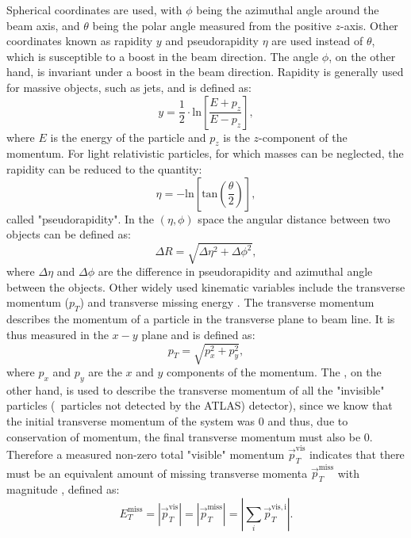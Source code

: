 	Spherical coordinates are used, with $\phi$ being the azimuthal angle around the beam axis, and $\theta$ being the polar angle measured from the positive $z$-axis. 
	Other coordinates known as rapidity $y$ and pseudorapidity $\eta$ are used instead of $\theta$, which is susceptible to a boost in the beam direction. The angle $\phi$, on the other hand, is invariant under a boost in the beam direction. 
	Rapidity is generally used for massive objects, such as jets, and is defined as:
	\begin{equation}
	y=\frac{1}{2}\cdot\mathrm{ln}\left[\frac{E+p_z}{E-p_z}\right],
	\end{equation}
	where $E$ is the energy of the particle and $p_z$ is the $z$-component of the momentum.
	For light relativistic particles, for which masses can be neglected, the 
	rapidity can be reduced to the quantity:
	\begin{equation}
	\eta=-\mathrm{ln}\left[\mathrm{tan}\left(\frac{\theta}{2}\right)\right],
	\end{equation}
	called "pseudorapidity".
	In the $(\eta,\phi)$ space the angular distance between two objects can be defined as:
	\begin{equation}
	\Delta R = \sqrt{\Delta\eta^2+\Delta\phi^2},
	\end{equation}
	where $\Delta\eta$ and $\Delta\phi$ are the difference in pseudorapidity and azimuthal angle between the objects.
	Other widely used kinematic variables include the transverse momentum ($p_T$) and transverse missing energy \met.
	The transverse momentum describes the momentum of a particle in the transverse plane to beam line. It is thus measured in the $x-y$ plane and is defined as:
	\begin{equation}
	p_T = \sqrt{p_x^2+p_y^2},
	\end{equation}
	where $p_x$ and $p_y$ are the $x$ and $y$ components of the momentum.
	The \met, on the other hand, is used to describe the transverse momentum of all the "invisible" particles (\ie\ particles not detected by the \ac{ATLAS}) detector), since we know that the initial transverse momentum of the system was 0 and thus, due to conservation of momentum, the final transverse momentum must also be 0.
	Therefore a measured non-zero total "visible" momentum $\vec{p}^{\mathrm{vis}}_T$ indicates that there must be an equivalent amount of missing transverse momenta $\vec{p}^{\mathrm{miss}}_T$ with magnitude \met, defined as:
	\begin{equation}
	E_T^{\textrm{miss}}=|\vec{p}^{\mathrm{vis}}_T|=|\vec{p}^{\mathrm{miss}}_T|=|\sum_{i}\vec{p}^{\mathrm{vis,i}}_T|.
	\end{equation}

